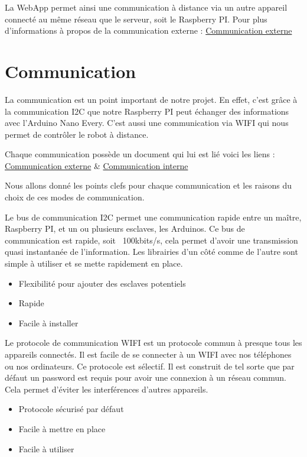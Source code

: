 \documentclass[
	a4paper,									%
	11pt,										%
	twoside,									%
	openright,									%
	notitlepage,									%
	parskip=half,								%
]{scrreprt}										%
\begin{document}
La WebApp permet ainsi une communication à distance via un autre appareil connecté au même réseau que le serveur, soit 
le Raspberry PI. Pour plus d'informations à propos de la communication externe : \href{run:./Comm_Externe}{Communication externe} \par

\section{Communication}

La communication est un point important de notre projet. En effet, c'est grâce à la communication I2C que notre Raspberry PI peut 
échanger des informations avec l'Arduino Nano Every. C'est aussi une communication via WIFI qui nous permet de contrôler le robot 
à distance. \par

Chaque communication possède un document qui lui est lié voici les liens : \href{run:./Comm_Externe}{Communication externe} \&
\href{run:./Comm_interne}{Communication interne} \par

Nous allons donné les points clefs pour chaque communication et les raisons du choix de ces modes de communication. \par

Le bus de communication I2C permet une communication rapide entre un maître, Raspberry PI, et un ou plusieurs esclaves, les Arduinos. 
Ce bus de communication est rapide, soit ~100kbits/s, cela permet d'avoir une transmission quasi instantanée de l'information.
Les librairies d'un côté comme de l'autre sont simple à utiliser et se mette rapidement en place. 

\begin{itemize}
	\item Flexibilité pour ajouter des esclaves potentiels
	\item Rapide
	\item Facile à installer
\end{itemize}

Le protocole de communication WIFI est un protocole commun à presque tous les appareils connectés. Il est facile de se connecter 
à un WIFI avec nos téléphones ou nos ordinateurs. Ce protocole est sélectif. Il est construit de tel sorte que par défaut un 
password est requis pour avoir une connexion à un réseau commun. Cela permet d'éviter les interférences d'autres appareils. 

\begin{itemize}
	\item Protocole sécurisé par défaut 
	\item Facile à mettre en place
	\item Facile à utiliser
\end{itemize}
\end{document}
